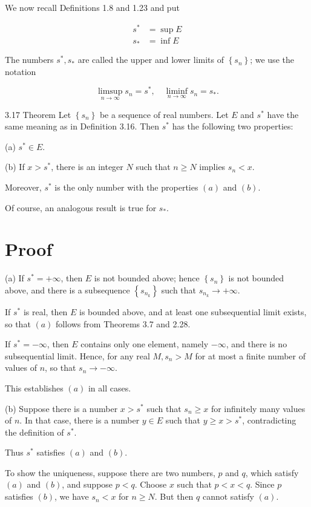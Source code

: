 \documentclass[10pt]{article}
\begin{document}
We now recall Definitions 1.8 and 1.23 and put

$$
\begin{aligned}
s^{*} & =\sup E \\
s_{*} & =\inf E
\end{aligned}
$$

The numbers $s^{*}, s_{*}$ are called the upper and lower limits of $\left\{s_{n}\right\}$; we use the notation

$$
\limsup _{n \rightarrow \infty} s_{n}=s^{*}, \quad \liminf _{n \rightarrow \infty} s_{n}=s_{*} .
$$

3.17 Theorem Let $\left\{s_{n}\right\}$ be a sequence of real numbers. Let $E$ and $s^{*}$ have the same meaning as in Definition 3.16. Then $s^{*}$ has the following two properties:

(a) $s^{*} \in E$.

(b) If $x>s^{*}$, there is an integer $N$ such that $n \geq N$ implies $s_{n}<x$.

Moreover, $s^{*}$ is the only number with the properties $(a)$ and $(b)$.

Of course, an analogous result is true for $s_{*}$.

\section{Proof}
(a) If $s^{*}=+\infty$, then $E$ is not bounded above; hence $\left\{s_{n}\right\}$ is not bounded above, and there is a subsequence $\left\{s_{n_{k}}\right\}$ such that $s_{n_{k}} \rightarrow+\infty$.

If $s^{*}$ is real, then $E$ is bounded above, and at least one subsequential limit exists, so that $(a)$ follows from Theorems 3.7 and 2.28.

If $s^{*}=-\infty$, then $E$ contains only one element, namely $-\infty$, and there is no subsequential limit. Hence, for any real $M, s_{n}>M$ for at most a finite number of values of $n$, so that $s_{n} \rightarrow-\infty$.

This establishes $(a)$ in all cases.

(b) Suppose there is a number $x>s^{*}$ such that $s_{n} \geq x$ for infinitely many values of $n$. In that case, there is a number $y \in E$ such that $y \geq x>s^{*}$, contradicting the definition of $s^{*}$.

Thus $s^{*}$ satisfies $(a)$ and $(b)$.

To show the uniqueness, suppose there are two numbers, $p$ and $q$, which satisfy $(a)$ and $(b)$, and suppose $p<q$. Choose $x$ such that $p<x<q$. Since $p$ satisfies $(b)$, we have $s_{n}<x$ for $n \geq N$. But then $q$ cannot satisfy $(a)$.
\end{document}
